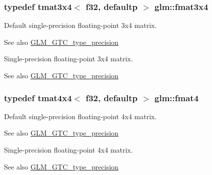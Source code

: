 \subsubsection[{fmat3x4}]{\setlength{\rightskip}{0pt plus 5cm}typedef tmat3x4$<$ f32, defaultp $>$ {\bf glm\+::fmat3x4}}\label{group__gtc__type__precision_gad68d9daa91ef05b29e80e044931837cf}
Default single-\/precision floating-\/point 3x4 matrix. \begin{DoxySeeAlso}{See also}
\hyperlink{group__gtc__type__precision}{G\+L\+M\+\_\+\+G\+T\+C\+\_\+type\+\_\+precision}
\end{DoxySeeAlso}
Single-\/precision floating-\/point 3x4 matrix. \begin{DoxySeeAlso}{See also}
\hyperlink{group__gtc__type__precision}{G\+L\+M\+\_\+\+G\+T\+C\+\_\+type\+\_\+precision} 
\end{DoxySeeAlso}
\hypertarget{group__gtc__type__precision_ga5a7b9713c32b3e8bf6ad41fce25f3205}{}
\subsubsection[{fmat4}]{\setlength{\rightskip}{0pt plus 5cm}typedef tmat4x4$<$ f32, defaultp $>$ {\bf glm\+::fmat4}}\label{group__gtc__type__precision_ga5a7b9713c32b3e8bf6ad41fce25f3205}
Default single-\/precision floating-\/point 4x4 matrix. \begin{DoxySeeAlso}{See also}
\hyperlink{group__gtc__type__precision}{G\+L\+M\+\_\+\+G\+T\+C\+\_\+type\+\_\+precision}
\end{DoxySeeAlso}
Single-\/precision floating-\/point 4x4 matrix. \begin{DoxySeeAlso}{See also}
\hyperlink{group__gtc__type__precision}{G\+L\+M\+\_\+\+G\+T\+C\+\_\+type\+\_\+precision} 
\end{DoxySeeAlso}
\hypertarget{group__gtc__type__precision_ga9325d382b334066a4c90a814c9040359}{}

